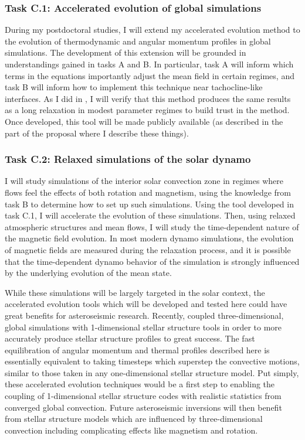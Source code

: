 \documentclass[aasms,12pt]{article}
\begin{document}
\subsubsection{Task C.1: Accelerated evolution of global simulations}
During my postdoctoral studies, I will extend my accelerated evolution method to the evolution of thermodynamic and angular momentum profiles in global simulations.
The development of this extension will be grounded in understandings gained in tasks A and B.
In particular, task A will inform which terms in the equations importantly adjust the mean field in certain regimes, and task B will inform how to implement this technique near tachocline-like interfaces.
As I did in \citet{anders&all2018}, I will verify that this method produces the same results as a long relaxation in modest parameter regimes to build trust in the method.
Once developed, this tool will be made publicly available (as described in the part of the proposal where I describe these things).

\subsubsection{Task C.2: Relaxed simulations of the solar dynamo}
I will study simulations of the interior solar convection zone in regimes where flows feel the effects of both rotation and magnetism, using the knowledge from task B to determine how to set up such simulations.
Using the tool developed in task C.1, I will accelerate the evolution of these simulations.
Then, using relaxed atmospheric structures and mean flows, I will study the time-dependent nature of the magnetic field evolution.
In most modern dynamo simulations, the evolution of magnetic fields are measured during the relaxation process, and it is possible that the time-dependent dynamo behavior of the simulation is strongly influenced by the underlying evolution of the mean state.

While these simulations will be largely targeted in the solar context, the accelerated evolution tools which will be developed and tested here could have great benefits for asteroseismic research.
Recently, \citet{jorgensen&weiss2019} coupled three-dimensional, global simulations with 1-dimensional stellar structure tools in order to more accurately produce stellar structure profiles to great success.
The fast equilibration of angular momentum and thermal profiles described here is essentially equivalent to taking timesteps which superstep the convective motions, similar to those taken in any one-dimensional stellar structure model.
Put simply, these accelerated evolution techniques would be a first step to enabling the coupling of 1-dimensional stellar structure codes with realistic statistics from converged global convection.
Future asteroseismic inversions will then benefit from stellar structure models which are influenced by three-dimensional convection including complicating effects like magnetism and rotation.
\end{document}
